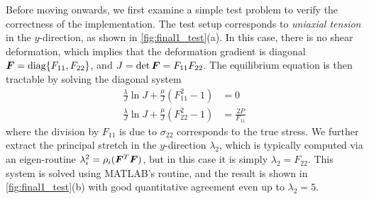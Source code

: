 Before moving onwards, we first examine a simple test problem to verify the correctness of the implementation.
The test setup corresponds to \emph{uniaxial tension} in the $y$-direction, as shown in \cref{fig:final1_test}{(a)}.
In this case, there is no shear deformation, which implies that the deformation gradient is diagonal $\bm{F} = \textrm{diag}\{F_{11}, F_{22}\}$, and $J = \det \bm{F} = F_{11} F_{22}$. 
The equilibrium equation is then tractable by solving the diagonal system 
\begin{equation}
\begin{aligned}
    \frac{\lambda}{J} \ln J + \frac{\mu}{J} (F_{11}^2 - 1) &= 0 \\
    \frac{\lambda}{J} \ln J + \frac{\mu}{J} (F_{22}^2 - 1) &= \frac{2P}{F_{11}}
\end{aligned}
\end{equation} 
where the division by $F_{11}$ is due to $\sigma_{22}$ corresponds to the true stress. 
We further extract the principal stretch in the $y$-direction $\lambda_2$, which is typically computed via an eigen-routine $\lambda_i^2 = \rho_i(\bm{F}^T \bm{F})$, but in this case it is simply $\lambda_2 = F_{22}$.
This system is solved using MATLAB's  routine, and the result is shown in \cref{fig:final1_test}{(b)} with good quantitative agreement even up to $\lambda_2 = 5$.
